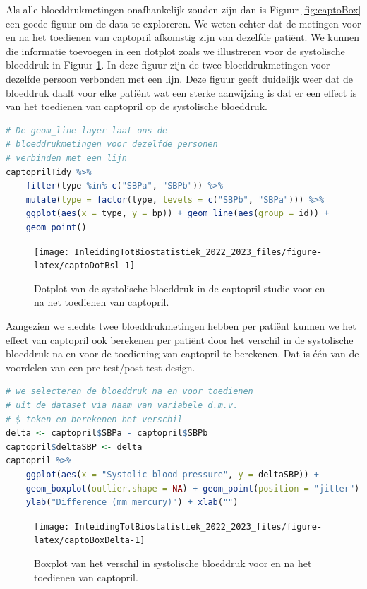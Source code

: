 \documentclass[
  12pt,dutch,coursenotes]{book}
\begin{document}
Als alle bloeddrukmetingen onafhankelijk zouden zijn dan is Figuur \ref{fig:captoBox} een goede figuur om de data te exploreren.
We weten echter dat de metingen voor en na het toedienen van captopril afkomstig zijn van dezelfde patiënt.
We kunnen die informatie toevoegen in een dotplot zoals we illustreren voor de systolische bloeddruk in Figuur \ref{fig:captoDotBsl}.
In deze figuur zijn de twee bloeddrukmetingen voor dezelfde persoon verbonden met een lijn.
Deze figuur geeft duidelijk weer dat de bloeddruk daalt voor elke patiënt wat een sterke aanwijzing is dat er een effect is van het toedienen van captopril op de systolische bloeddruk.

\begin{lstlisting}[language=R]
# De geom_line layer laat ons de
# bloeddrukmetingen voor dezelfde personen
# verbinden met een lijn
captoprilTidy %>%
    filter(type %in% c("SBPa", "SBPb")) %>%
    mutate(type = factor(type, levels = c("SBPb", "SBPa"))) %>%
    ggplot(aes(x = type, y = bp)) + geom_line(aes(group = id)) +
    geom_point()
\end{lstlisting}

\begin{figure}

{\centering \texttt{[image: InleidingTotBiostatistiek\_2022\_2023\_files/figure-latex/captoDotBsl-1]} 

}

\caption{Dotplot van de systolische bloeddruk in de captopril studie voor en na het toedienen van captopril.}\label{fig:captoDotBsl}
\end{figure}

Aangezien we slechts twee bloeddrukmetingen hebben per patiënt kunnen we het effect van captopril ook berekenen per patiënt door het verschil in de systolische bloeddruk na en voor de toediening van captopril te berekenen. Dat is één van de voordelen van een pre-test/post-test design.

\begin{lstlisting}[language=R]
# we selecteren de bloeddruk na en voor toedienen
# uit de dataset via naam van variabele d.m.v.
# $-teken en berekenen het verschil
delta <- captopril$SBPa - captopril$SBPb
captopril$deltaSBP <- delta
captopril %>%
    ggplot(aes(x = "Systolic blood pressure", y = deltaSBP)) +
    geom_boxplot(outlier.shape = NA) + geom_point(position = "jitter") +
    ylab("Difference (mm mercury)") + xlab("")
\end{lstlisting}

\begin{figure}

{\centering \texttt{[image: InleidingTotBiostatistiek\_2022\_2023\_files/figure-latex/captoBoxDelta-1]} 

}

\caption{Boxplot van het verschil in systolische bloeddruk voor en na het toedienen van captopril.}\label{fig:captoBoxDelta}
\end{figure}
\end{document}
